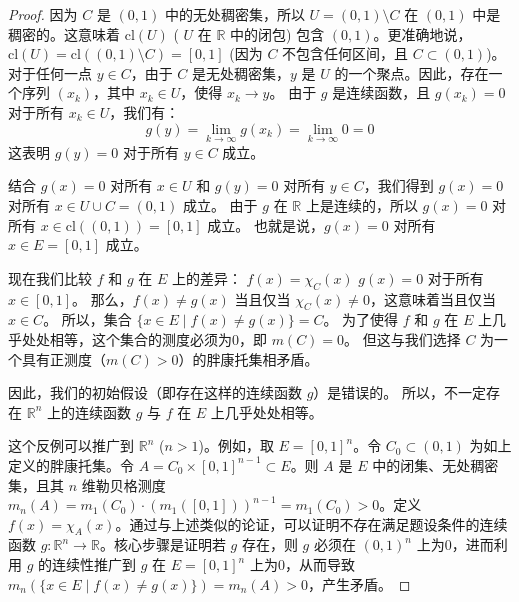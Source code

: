 \begin{proof}
因为 $C$ 是 $(0,1)$ 中的无处稠密集，所以 $U = (0,1) \setminus C$ 在 $(0,1)$ 中是稠密的。这意味着 $\text{cl}(U)$ ( $U$ 在 $\mathbb{R}$ 中的闭包) 包含 $(0,1)$。更准确地说，$\text{cl}(U) = \text{cl}((0,1) \setminus C) = [0,1]$ (因为 $C$ 不包含任何区间，且 $C \subset (0,1)$)。
对于任何一点 $y \in C$，由于 $C$ 是无处稠密集，$y$ 是 $U$ 的一个聚点。因此，存在一个序列 $(x_k)$，其中 $x_k \in U$，使得 $x_k \to y$。
由于 $g$ 是连续函数，且 $g(x_k)=0$ 对于所有 $x_k \in U$，我们有：
\[
g(y) = \lim_{k \to \infty} g(x_k) = \lim_{k \to \infty} 0 = 0
\]
这表明 $g(y)=0$ 对于所有 $y \in C$ 成立。

结合 $g(x)=0$ 对所有 $x \in U$ 和 $g(y)=0$ 对所有 $y \in C$，我们得到 $g(x)=0$ 对所有 $x \in U \cup C = (0,1)$ 成立。
由于 $g$ 在 $\mathbb{R}$ 上是连续的，所以 $g(x)=0$ 对所有 $x \in \text{cl}((0,1)) = [0,1]$ 成立。
也就是说，$g(x)=0$ 对所有 $x \in E = [0,1]$ 成立。

现在我们比较 $f$ 和 $g$ 在 $E$ 上的差异：
$f(x) = \chi_C(x)$
$g(x) = 0$ 对于所有 $x \in [0,1]$。
那么，$f(x) \neq g(x)$ 当且仅当 $\chi_C(x) \neq 0$，这意味着当且仅当 $x \in C$。
所以，集合 $\{x \in E \mid f(x) \neq g(x)\} = C$。
为了使得 $f$ 和 $g$ 在 $E$ 上几乎处处相等，这个集合的测度必须为0，即 $m(C)=0$。
但这与我们选择 $C$ 为一个具有正测度（$m(C)>0$）的胖康托集相矛盾。

因此，我们的初始假设（即存在这样的连续函数 $g$）是错误的。
所以，不一定存在 $\mathbb{R}^n$ 上的连续函数 $g$ 与 $f$ 在 $E$ 上几乎处处相等。

这个反例可以推广到 $\mathbb{R}^n$ ($n>1$)。例如，取 $E = [0,1]^n$。令 $C_0 \subset (0,1)$ 为如上定义的胖康托集。令 $A = C_0 \times [0,1]^{n-1} \subset E$。则 $A$ 是 $E$ 中的闭集、无处稠密集，且其 $n$ 维勒贝格测度 $m_n(A) = m_1(C_0) \cdot (m_1([0,1]))^{n-1} = m_1(C_0) > 0$。定义 $f(x) = \chi_A(x)$。通过与上述类似的论证，可以证明不存在满足题设条件的连续函数 $g:\mathbb{R}^n \to \mathbb{R}$。核心步骤是证明若 $g$ 存在，则 $g$ 必须在 $(0,1)^n$ 上为0，进而利用 $g$ 的连续性推广到 $g$ 在 $E=[0,1]^n$ 上为0，从而导致 $m_n(\{x \in E \mid f(x) \neq g(x)\}) = m_n(A) > 0$，产生矛盾。
\end{proof}

